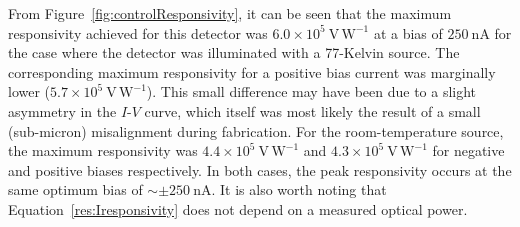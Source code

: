 From Figure~\ref{fig:controlResponsivity}, it can be seen that the maximum responsivity achieved for this detector was $6.0 \times 10^{5}~\mathrm{V\,W^{-1}}$ at a bias of $250~\mathrm{nA}$ for the case where the detector was illuminated with a 77-Kelvin source. The corresponding maximum responsivity for a positive bias current was marginally lower ($5.7 \times 10^{5}~\mathrm{V\,W^{-1}}$). This small difference may have been due to a slight asymmetry in the $I$-$V$ curve, which itself was most likely the result of a small (sub-micron) misalignment during fabrication. For the room-temperature source, the maximum responsivity was $4.4 \times 10^{5}~\mathrm{V\,W^{-1}}$ and $4.3 \times 10^{5}~\mathrm{V\,W^{-1}}$ for negative and positive biases respectively. In both cases, the peak responsivity occurs at the same optimum bias of $\sim \pm 250~\mathrm{nA}$. It is also worth noting that Equation~\ref{res:Iresponsivity} does not depend on a measured optical power.
%
